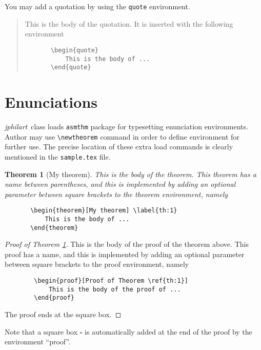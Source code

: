 \documentclass{jphilart}
\newcommand{\jphilart}{\emph{jphilart}\ } %
\newtheorem{theorem}{Theorem} %
\begin{document}
You may add a quotation by using the \texttt{quote} environment.
\begin{quote}
   This is the body of the quotation.
   It is inserted with the following environment
   \begin{verbatim}
       \begin{quote}
           This is the body of ...
       \end{quote}\end{verbatim}
\end{quote}

\section{Enunciations}

\jphilart class loads \texttt{asmthm} package for typesetting enunciation
environments. Author may use \verb+\newtheorem+ command in order to define
environment for further use. The precise location of these extra load
commands is clearly mentioned in the \texttt{sample.tex} file.

\begin{theorem}[My theorem]\label{th:1}
    This is the body of the theorem. This theorem has a name between
    parentheses, and this is implemented by adding an optional parameter
    between square brackets to the theorem environment, namely
   \begin{verbatim}
       \begin{theorem}[My theorem] \label{th:1}
           This is the body of ...
       \end{theorem}\end{verbatim}
\end{theorem}

\begin{proof}[Proof of Theorem \ref{th:1}]
    This is the body of the proof of the theorem above. This proof has a name,
    and this is implemented by adding an optional parameter between square
    brackets to the proof environment, namely
    \begin{verbatim}
        \begin{proof}[Proof of Theorem \ref{th:1}]
            This is the body of the proof of ...
        \end{proof}\end{verbatim}
    The proof ends at the square box.
\end{proof}

Note that a square box $\square$ is automatically added at the end of the
proof by the environment ``proof''.
\end{document}

